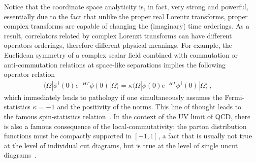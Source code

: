 \documentclass[a4paper,11pt]{article}
\begin{document}
Notice that the coordinate space analyticity is, in fact, very strong and powerful, essentially due to the fact that unlike the proper real Lorentz transforms, proper complex transforms are capable of changing the (imaginary) time orderings. As a result, correlators related by complex Lorenzt transforms can have different operators orderings, therefore different physical meanings. For example, the Euclidean symmetry of a complex scalar field combined with commutation or anti-commutation relations at space-like separations implies the following operator relation
\begin{align}
\langle \Omega|\phi^{\dagger}(0)e^{-HT}\phi(0)| \Omega\rangle= \kappa\langle \Omega|\phi(0)e^{-HT}\phi^{\dagger}(0)|\Omega\rangle \ ,
\end{align}
which immediately leads to  pathology if one simultaneously assumes the Fermi-statistics $\kappa=-1$ and the positivity of the norms. This line of thought leads to the famous spin-statistics relation~\cite{Streater:1989vi}. In the context of the UV limit of QCD, there is also a famous consequence of the local-commutativity: the  parton distribution functions must be compactly supported in $[-1,1]$, a fact that is usually not true at the level of individual cut diagrams, but is true at the level of single uncut diagrams~\cite{Collins:2011zzd}. 
\end{document}
